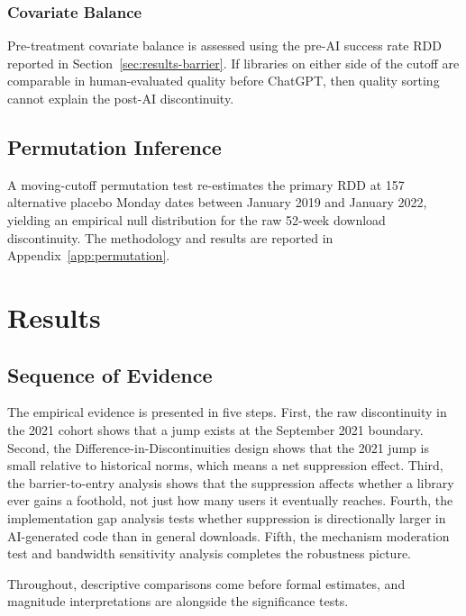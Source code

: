 \documentclass[12pt, a4paper]{report}
\begin{document}
\subsection{Covariate Balance}\label{subsec:rob-covariates}
Pre-treatment covariate balance is assessed using the pre-AI success rate RDD reported in Section~\ref{sec:results-barrier}. If libraries on either side of the cutoff are comparable in human-evaluated quality before ChatGPT, then quality sorting cannot explain the post-AI discontinuity.

\section{Permutation Inference}\label{sec:methods-permutation}
A moving-cutoff permutation test re-estimates the primary RDD at 157 alternative placebo Monday dates between January 2019 and January 2022, yielding an empirical null distribution for the raw 52-week download discontinuity. The methodology and results are reported in Appendix~\ref{app:permutation}.

\chapter{Results}\label{ch:results}

\section{Sequence of Evidence}\label{sec:results-sequence}
The empirical evidence is presented in five steps. First, the raw discontinuity in the 2021 cohort shows that a jump exists at the September 2021 boundary. Second, the Difference-in-Discontinuities design shows that the 2021 jump is small relative to historical norms, which means a net suppression effect. Third, the barrier-to-entry analysis shows that the suppression affects whether a library ever gains a foothold, not just how many users it eventually reaches. Fourth, the implementation gap analysis tests whether suppression is directionally larger in AI-generated code than in general downloads. Fifth, the mechanism moderation test and bandwidth sensitivity analysis completes the robustness picture.

Throughout, descriptive comparisons come before formal estimates, and magnitude interpretations are alongside the significance tests.
\end{document}
